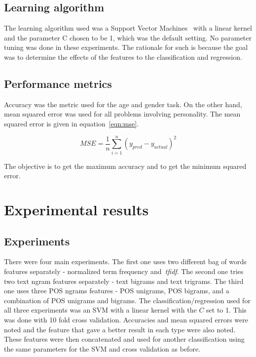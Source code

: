\documentclass[a4paper]{llncs}
\begin{document}
\subsection{Learning algorithm}
The learning algorithm used was a Support Vector Machines~\cite{cortes1995support} with a linear kernel and the parameter C chosen to be 1, which was the default setting. No parameter tuning was done in these experiments. The rationale for such is because the goal was to determine the effects of the features to the classification and regression.  
\subsection{Performance metrics}
Accuracy was the metric used for the age and gender task. On the other hand, mean squared error was used for all problems involving personality. The mean squared error is given in equation~\ref{eqn:mse}.

\begin{equation}
MSE =\frac{1}{n} \sum_{i=1}^n \left( y_{pred}-y_{actual}\right)^2 
\label{eqn:mse}
\end{equation}


The objective is to get the maximum accuracy and to get the minimum squared error. 
\section{Experimental results}
\subsection{Experiments}
There were four main experiments. The first one uses two different bag of words features separately - normalized term frequency and~\textit{tfidf}. The second one tries two text ngram features separately - text bigrams and text trigrams. The third one uses three POS ngrams features - POS unigrams, POS bigrams, and a combination of POS unigrams and bigrams. The classification/regression used for all three experiments was an SVM with a linear kernel with the $C$ set to 1. This was done with 10 fold cross validation. Accuracies and mean squared errors were noted and the feature that gave a better result in each type were also noted. These features were then concatenated and used for another classification using the same parameters for the SVM and cross validation as before. 
\end{document}
